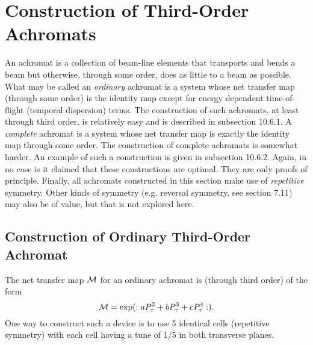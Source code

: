 \section{Construction of Third-Order Achromats}
\label{achromat}
An achromat is a collection of beam-line elements that transports and
bends a beam but otherwise, through some order, does as little to a beam
as possible.  What may be called an {\em ordinary} achromat is a system
whose net transfer map (through some order) is the identity map except
for energy dependent time-of-flight (temporal dispersion) terms.  The construction of such
achromats, at least through third order, is relatively easy and is
described in subsection 10.6.1.  A {\em complete} achromat is a system
whose net transfer map is exactly the identity map through some order.
The construction of complete achromats is somewhat harder.  An example of
such a construction is given in subsection 10.6.2.  Again, in no case is
it claimed that these constructions are optimal.  They are only proofs of
principle.  Finally, all achromats constructed in this section make use
of {\em repetitive} symmetry.  Other kinds of symmetry (e.g. reversal
symmetry, see section 7.11) may also be of value, but that is not
explored here.

\subsection{Construction of Ordinary Third-Order Achromat}
\label{ordinary}
The net transfer map ${\cal M}$ for an ordinary achromat is (through
third order) of the form
\begin{equation}
{\cal M} = \exp (:aP^2_{\tau} + bP^3_{\tau} + cP^4_{\tau}:).
\end{equation}
One way to construct such a device is to use 5 identical cells
(repetitive symmetry) with each
cell having a tune of 1/5 in both transverse planes.

